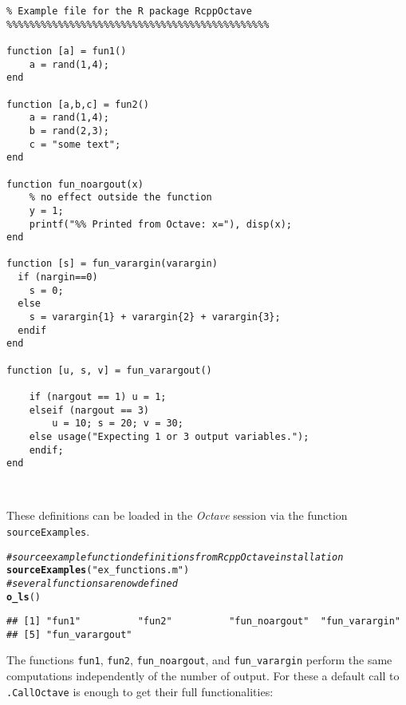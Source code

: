 \documentclass[english,10pt,a4paper]{article}\usepackage[]{graphicx}\usepackage[]{color}
\makeatletter
\newcommand{\hlstr}[1]{\textcolor[rgb]{0.192,0.494,0.8}{#1}}%
\newcommand{\hlcom}[1]{\textcolor[rgb]{0.678,0.584,0.686}{\textit{#1}}}%
\newcommand{\hlstd}[1]{\textcolor[rgb]{0.345,0.345,0.345}{#1}}%
\newcommand{\hlkwd}[1]{\textcolor[rgb]{0.737,0.353,0.396}{\textbf{#1}}}%
\newenvironment{kframe}{%
 \def\at@end@of@kframe{}%
 \ifinner\ifhmode%
  \def\at@end@of@kframe{\end{minipage}}%
  \begin{minipage}{\columnwidth}%
 \fi\fi%
 \def\FrameCommand##1{\hskip\@totalleftmargin \hskip-\fboxsep
 \colorbox{shadecolor}{##1}\hskip-\fboxsep
     \hskip-\linewidth \hskip-\@totalleftmargin \hskip\columnwidth}%
 \MakeFramed {\advance\hsize-\width
   \@totalleftmargin\z@ \linewidth\hsize
   \@setminipage}}%
 {\par\unskip\endMakeFramed%
 \at@end@of@kframe}
\newenvironment{knitrout}{}{} %
\let\proglang=\textit
\let\code=\texttt
\newcommand{\octave}{\proglang{Octave}\xspace}
\makeatother
\begin{document}
\begin{Verbatim}[frame=single]
%%%%%%%%%%%%%%%%%%%%%%%%%%%%%%%%%%%%%%%%%%%%%%
% Example file for the R package RcppOctave
%%%%%%%%%%%%%%%%%%%%%%%%%%%%%%%%%%%%%%%%%%%%%%

function [a] = fun1()
	a = rand(1,4);
end

function [a,b,c] = fun2()
	a = rand(1,4);
	b = rand(2,3);
	c = "some text";
end

function fun_noargout(x) 
	% no effect outside the function
	y = 1;
	printf("%% Printed from Octave: x="), disp(x);
end

function [s] = fun_varargin(varargin)
  if (nargin==0)
	s = 0;
  else
	s = varargin{1} + varargin{2} + varargin{3};
  endif
end

function [u, s, v] = fun_varargout()

	if (nargout == 1) u = 1; 
	elseif (nargout == 3)
		u = 10; s = 20; v = 30; 
	else usage("Expecting 1 or 3 output variables.");
	endif; 
end



\end{Verbatim}

These definitions can be loaded in the \octave session via the function
\code{sourceExamples}.

\begin{knitrout}
\color{fgcolor}\begin{kframe}
\begin{alltt}
\hlcom{# source example function definitions from RcppOctave installation}
\hlkwd{sourceExamples}\hlstd{(}\hlstr{"ex_functions.m"}\hlstd{)}
\hlcom{# several functions are now defined}
\hlkwd{o_ls}\hlstd{()}
\end{alltt}
\begin{verbatim}
## [1] "fun1"          "fun2"          "fun_noargout"  "fun_varargin" 
## [5] "fun_varargout"
\end{verbatim}
\end{kframe}
\end{knitrout}


The functions \code{fun1}, \code{fun2}, \code{fun\_noargout}, and
\code{fun\_varargin} perform the same computations independently of the number
of output.
For these a default call to \code{.CallOctave} is enough to get their full
functionalities:
\end{document}
